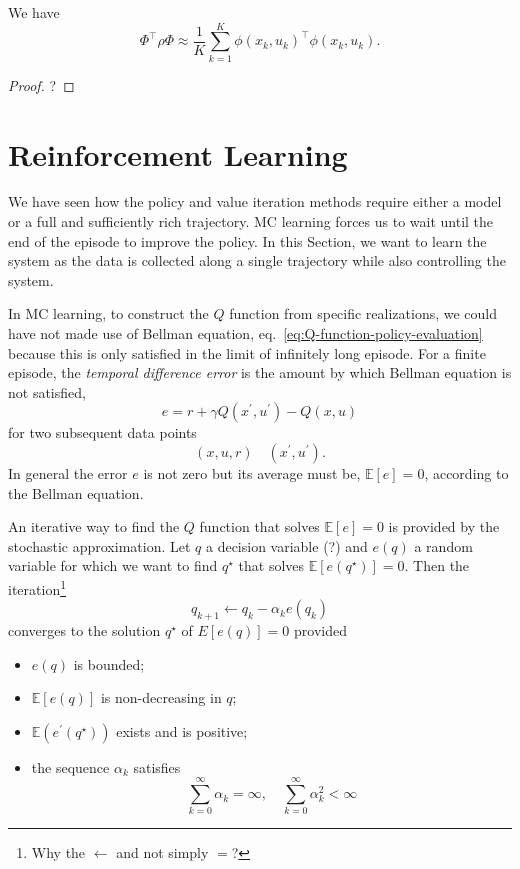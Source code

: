 \begin{theorem}
  We have
  \begin{equation*}
    \Phi^\top\rho\Phi \approx \frac{1}{K} \sum_{k=1}^K \phi(x_k,u_k)^\top\phi(x_k,u_k).
  \end{equation*}
\end{theorem}
\begin{proof}
  ?
\end{proof}

\section{Reinforcement Learning}
\label{sec:r-learning}

We have seen how the policy and value iteration methods require either a model or a full and sufficiently rich trajectory. MC learning forces us to wait until the end of the episode to improve the policy. In this Section, we want to learn the system as the data is collected along a single trajectory while also controlling the system.

In MC learning, to construct the $Q$ function from specific realizations, we could have not made use of Bellman equation, eq.~\eqref{eq:Q-function-policy-evaluation} because this is only satisfied in the limit of infinitely long episode. For a finite episode, the \emph{temporal difference error} is the amount by which Bellman equation is not satisfied,
\begin{equation}
  \label{eq:TD-error}
  e = r + \gamma Q(x^\prime,u^\prime) - Q(x,u)
\end{equation}
for two subsequent data points
\begin{equation*}
  (x,u,r)\quad (x^\prime,u^\prime).
\end{equation*}
In general the error $e$ is not zero but its average must be, $\mathbb{E}[e] = 0$, according to the Bellman equation.

An iterative way to find the $Q$ function that solves $\mathbb{E}[e] = 0$ is provided by the stochastic approximation. Let $q$ a decision variable (?) and $e(q)$ a random variable for which we want to find $q^\star$ that solves $\mathbb{E}[e(q^\star)]=0$. Then the iteration\footnote{Why the $\leftarrow$ and not simply $=$?}
\begin{equation}
  \label{eq:TD-error-iterative-solution}
  q_{k+1} \leftarrow q_k -\alpha_k e(q_k)
\end{equation}
converges to the solution $q^\star$ of $E[e(q)]=0$ provided
\begin{itemize}
\item $e(q)$ is bounded;
\item $\mathbb{E}[e(q)]$ is non-decreasing in $q$;
\item $\mathbb{E}(e^\prime(q^\star))$ exists and is positive;
\item the sequence $\alpha_k$ satisfies
  \begin{equation*}
    \sum_{k=0}^\infty \alpha_k = \infty, \quad \sum_{k=0}^\infty \alpha_k^2 < \infty
  \end{equation*}
\end{itemize}

